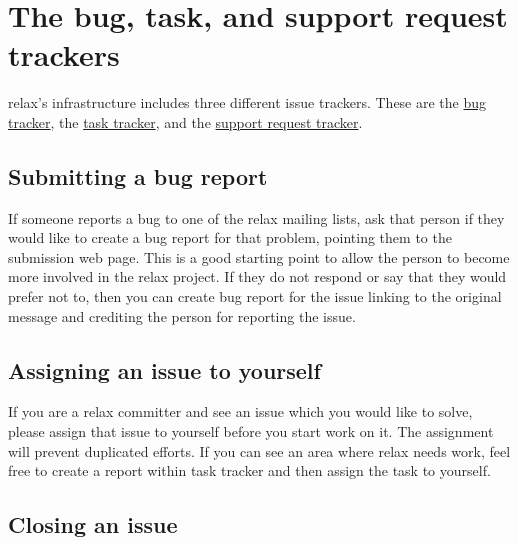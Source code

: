 
\section{The bug, task, and support request trackers}

relax's infrastructure includes three different issue trackers.  These are the \href{https://gna.org/bugs/?group=relax}{bug tracker}, the \href{https://gna.org/task/?group=relax}{task tracker}, and the \href{https://gna.org/support/?group=relax}{support request tracker}.



\subsection{Submitting a bug report}

If someone reports a bug to one of the relax mailing lists, ask that person if they would like to create a bug report for that problem, pointing them to the submission web page.  This is a good starting point to allow the person to become more involved in the relax project.  If they do not respond or say that they would prefer not to, then you can create bug report for the issue linking to the original message and crediting the person for reporting the issue.



\subsection{Assigning an issue to yourself}

If you are a relax committer and see an issue which you would like to solve, please assign that issue to yourself before you start work on it.  The assignment will prevent duplicated efforts.  If you can see an area where relax needs work, feel free to create a report within task tracker and then assign the task to yourself.



\subsection{Closing an issue}

